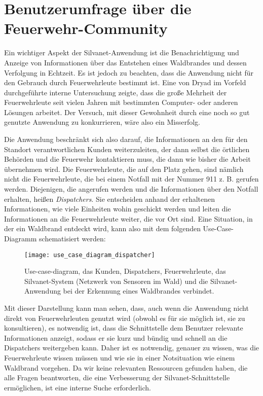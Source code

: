 \section{Benutzerumfrage über die Feuerwehr-Community}

Ein wichtiger Aspekt der Silvanet-Anwendung ist die Benachrichtigung und Anzeige von Informationen über das Entstehen eines Waldbrandes und dessen Verfolgung in Echtzeit.
Es ist jedoch zu beachten, dass die Anwendung nicht für den Gebrauch durch Feuerwehrleute bestimmt ist.
Eine von Dryad im Vorfeld durchgeführte interne Untersuchung zeigte, dass die große Mehrheit der Feuerwehrleute seit vielen Jahren mit bestimmten Computer- oder anderen Lösungen arbeitet.
Der Versuch, mit dieser Gewohnheit durch eine noch so gut genutzte Anwendung zu konkurrieren, wäre also ein Misserfolg.

Die Anwendung beschränkt sich also darauf, die Informationen an den für den Standort verantwortlichen Kunden weiterzuleiten, der dann selbst die örtlichen Behörden und die Feuerwehr kontaktieren muss, die dann wie bisher die Arbeit übernehmen wird.
Die Feuerwehrleute, die auf den Platz gehen, sind nämlich nicht die Feuerwehrleute, die bei einem Notfall mit der Nummer 911 z. B. gerufen werden.
Diejenigen, die angerufen werden und die Informationen über den Notfall erhalten, heißen \textit{Dispatchers}.
Sie entscheiden anhand der erhaltenen Informationen, wie viele Einheiten wohin geschickt werden und leiten die Informationen an die Feuerwehrleute weiter, die vor Ort sind.
Eine Situation, in der ein Waldbrand entdeckt wird, kann also mit dem folgenden Use-Case-Diagramm schematisiert werden:

\begin{figure}[H]
  \centering
  \texttt{[image: use\_case\_diagram\_dispatcher]}
  \caption{Use-case-diagram, das Kunden, Dispatchers, Feuerwehrleute, das Silvanet-System (Netzwerk von Sensoren im Wald) und die Silvanet-Anwendung bei der Erkennung eines Waldbrandes verbindet.}
  \label{fig:use_case_diagram_dispatcher}
\end{figure}

Mit dieser Darstellung kann man sehen, dass, auch wenn die Anwendung nicht direkt von Feuerwehrleuten genutzt wird (obwohl es für sie möglich ist, sie zu konsultieren), es notwendig ist, dass die Schnittstelle dem Benutzer relevante Informationen anzeigt, sodass er sie kurz und bündig und schnell an die Dispatchers weitergeben kann.
Daher ist es notwendig, genauer zu wissen, was die Feuerwehrleute wissen müssen und wie sie in einer Notsituation wie einem Waldbrand vorgehen.
Da wir keine relevanten Ressourcen gefunden haben, die alle Fragen beantworten, die eine Verbesserung der Silvanet-Schnittstelle ermöglichen, ist eine interne Suche erforderlich.

